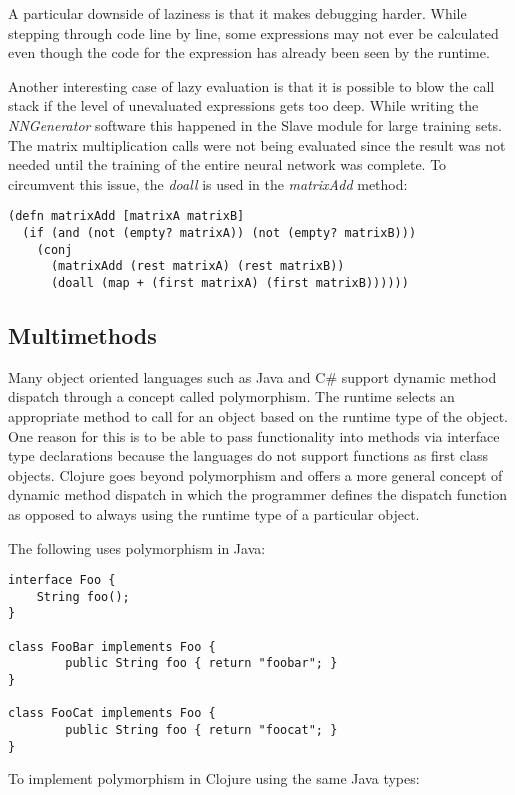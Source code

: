 A particular downside of laziness is that it makes debugging harder. 
While stepping through code line by line, some expressions may not
ever be calculated even though the code for the expression has already
been seen by the runtime.

Another interesting case of lazy evaluation is that it is possible to
blow the call stack if the level of unevaluated expressions gets too
deep. While writing the {\em NNGenerator} software this happened in
the Slave module for large training sets. The matrix multiplication
calls were not being evaluated since the result was not needed until
the training of the entire neural network was complete.
To circumvent this issue, the {\it doall} is used in the {\it
  matrixAdd} method:
 
\lstset{language=Clojure}
\begin{lstlisting}
(defn matrixAdd [matrixA matrixB]
  (if (and (not (empty? matrixA)) (not (empty? matrixB)))
    (conj
      (matrixAdd (rest matrixA) (rest matrixB))
      (doall (map + (first matrixA) (first matrixB))))))
\end{lstlisting}

\subsection{Multimethods}
Many object oriented languages such as Java and C\# support dynamic
method dispatch through a concept called polymorphism. 
The runtime selects an appropriate method to call for an object based
on the runtime type of the object. 
One reason for this is to be able to pass functionality into methods via interface type declarations because the languages do not support functions as first class objects. 
Clojure goes beyond polymorphism and offers a more general concept of dynamic method dispatch in which the programmer defines
the dispatch function as opposed to always using the runtime type of a particular object. 

The following uses polymorphism in Java:

\lstset{language=Java}
\begin{lstlisting}
interface Foo { 
	String foo(); 
}

class FooBar implements Foo {
        public String foo { return "foobar"; }
}

class FooCat implements Foo {
        public String foo { return "foocat"; }
}
\end{lstlisting}

To implement polymorphism in Clojure using the same Java types:

